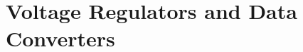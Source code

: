 \documentclass[../course]{subfiles}
\begin{document}
\chapter{Voltage Regulators and Data Converters}


\end{document}
